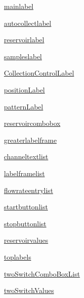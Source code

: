\begin{DoxyCompactItemize}
\item 
\mbox{\hyperlink{classgui_1_1_manual_page_a43e9ea043edca3eb9a99a2feb9c99c6d}{mainlabel}}
\item 
\mbox{\hyperlink{classgui_1_1_manual_page_a20a0a4a3fc1d793fc086a49378e4d2a5}{autocollectlabel}}
\item 
\mbox{\hyperlink{classgui_1_1_manual_page_a2e3fa9ebbb630eba80356fe03611cb53}{reservoirlabel}}
\item 
\mbox{\hyperlink{classgui_1_1_manual_page_a8cb85317acf8e4ec0ba111ffc746079f}{sampleslabel}}
\item 
\mbox{\hyperlink{classgui_1_1_manual_page_abace56d47fcc1bf1e437d575febc552e}{Collection\+Control\+Label}}
\item 
\mbox{\hyperlink{classgui_1_1_manual_page_ac2d54d8c9e5e1138aad2907338d5521f}{position\+Label}}
\item 
\mbox{\hyperlink{classgui_1_1_manual_page_ad11be888b660401d0d693c9b89e57afb}{pattern\+Label}}
\item 
\mbox{\hyperlink{classgui_1_1_manual_page_a81742f5043336dcd86cc5a49a8842225}{reservoircombobox}}
\item 
\mbox{\hyperlink{classgui_1_1_manual_page_af3051ffdca2cc8da15359ca39934cc8d}{greaterlabelframe}}
\item 
\mbox{\hyperlink{classgui_1_1_manual_page_a98e1323e011b1c5fddd68daa6c4564a2}{channeltextlist}}
\item 
\mbox{\hyperlink{classgui_1_1_manual_page_a0e543caa586d503baa50c4bbc77cf777}{labelframelist}}
\item 
\mbox{\hyperlink{classgui_1_1_manual_page_a517224e5644c198d0547c74498750d32}{flowrateentrylist}}
\item 
\mbox{\hyperlink{classgui_1_1_manual_page_a203322c2b0aa186d5dbeb916320a8b59}{startbuttonlist}}
\item 
\mbox{\hyperlink{classgui_1_1_manual_page_ae566c41ce4b2ff40c71705a4d8cc41c9}{stopbuttonlist}}
\item 
\mbox{\hyperlink{classgui_1_1_manual_page_aacb6dcd61d0ba3d66a9c0d6f4965748c}{reservoirvalues}}
\item 
\mbox{\hyperlink{classgui_1_1_manual_page_a582f9bdf914d8386fb177da3ef83f484}{toplabels}}
\item 
\mbox{\hyperlink{classgui_1_1_manual_page_ae8fcb7ede056aa1b198fa0167e3bfe71}{two\+Switch\+Combo\+Box\+List}}
\item 
\mbox{\hyperlink{classgui_1_1_manual_page_a41976d3f84ef937f5f701312978e2eb6}{two\+Switch\+Values}}
\end{DoxyCompactItemize}


